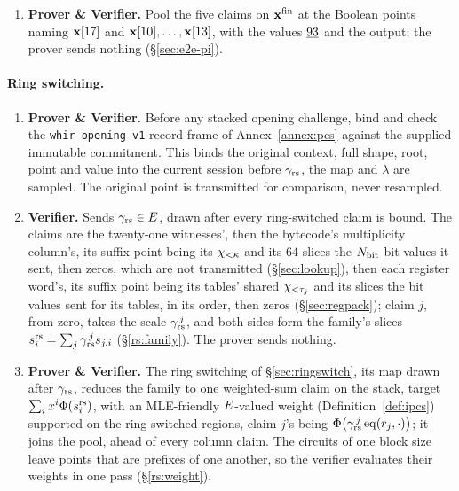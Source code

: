 \begin{enumerate}
\item \textbf{Prover \& Verifier.} Pool the five claims on $\mathbf{x}^{\mathrm{fin}}$ at the Boolean points naming $\mathbf{x}[17]$ and $\mathbf{x}[10],\dots,\mathbf{x}[13]$, with the values $\underline{93}$ and the output; the prover sends nothing (\S\ref{sec:e2e-pi}).
\end{enumerate}

\paragraph{Ring switching.}

\begin{enumerate}
\item \textbf{Prover \& Verifier.} Before any stacked opening challenge, bind and check the \texttt{whir-opening-v1} record frame of Annex~\ref{annex:pcs} against the supplied immutable commitment. This binds the original context, full shape, root, point and value into the current session before $\gamma_{\mathrm{rs}}$, the map and $\lambda$ are sampled. The original point is transmitted for comparison, never resampled.
\item \textbf{Verifier.} Sends $\gamma_{\mathrm{rs}}\in E$, drawn after every ring-switched claim is bound. The claims are the twenty-one witnesses', then the bytecode's multiplicity column's, its suffix point being its $\chi_{<\kappa}$ and its $64$ slices the $N_{\mathrm{bit}}$ bit values it sent, then zeros, which are not transmitted (\S\ref{sec:lookup}), then each register word's, its suffix point being its tables' shared $\chi_{<\tau_j}$ and its slices the bit values sent for its tables, in its order, then zeros (\S\ref{sec:regpack}); claim $j$, from zero, takes the scale $\gamma_{\mathrm{rs}}^{\,j}$, and both sides form the family's slices $s^{\mathrm{rs}}_{i}=\sum_j\gamma_{\mathrm{rs}}^{\,j}s_{j,i}$ (\S\ref{rs:family}). The prover sends nothing.
\item \textbf{Prover \& Verifier.} The ring switching of \S\ref{sec:ringswitch}, its map drawn after $\gamma_{\mathrm{rs}}$, reduces the family to one weighted-sum claim on the stack, target $\sum_ix^i\Phi(s^{\mathrm{rs}}_{i})$, with an MLE-friendly $E$-valued weight (Definition~\ref{def:ipcs}) supported on the ring-switched regions, claim $j$'s being $\Phi\bigl(\gamma_{\mathrm{rs}}^{\,j}\operatorname{eq}(r_j,\cdot)\bigr)$; it joins the pool, ahead of every column claim. The circuits of one block size leave points that are prefixes of one another, so the verifier evaluates their weights in one pass (\S\ref{rs:weight}).
\end{enumerate}


